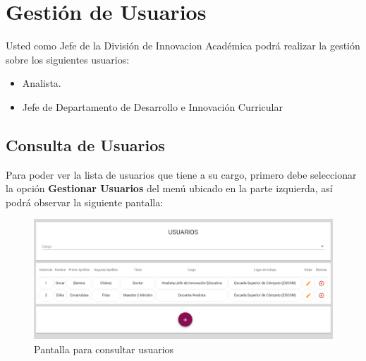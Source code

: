 
\chapter{Gestión de Usuarios}
    
    Usted como Jefe de la División de Innovacion Académica podrá realizar la gestión sobre los siguientes usuarios:
    \begin{itemize}
        \item Analista.
        \item Jefe de Departamento de Desarrollo e Innovación Curricular
    \end{itemize}
    

    \section{Consulta de Usuarios}
        
        Para poder ver la lista de usuarios que tiene a su cargo, primero debe seleccionar la opción \textbf{Gestionar Usuarios} del menú ubicado en la parte izquierda, así podrá observar la siguiente pantalla:
        
        \begin{figure}[!hbtp]
            \centering
            \hypertarget{consultarUs}{\includegraphics[width=0.7\linewidth]{images/SP5/Consultar-Usuario}}
            \caption{Pantalla para consultar usuarios}
            \label{consultarrh}
        \end{figure}
        

